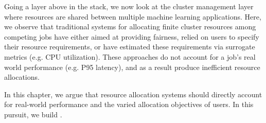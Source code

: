 Going a layer above in the stack, we now look at the cluster management layer where resources are shared between multiple machine learning applications. Here, we observe that 
traditional systems for allocating finite cluster resources among competing jobs
have either aimed at providing fairness,
relied on users to specify their resource requirements,
or have estimated these requirements via surrogate metrics (e.g. CPU utilization).
These approaches do not account for a job's real world performance (e.g. P95 latency), and as a result produce inefficient resource allocations.

In this chapter, 
we argue that resource allocation systems should directly account for real-world
performance and the varied allocation objectives of users.
In this pursuit, we build \cilantro{}. %

